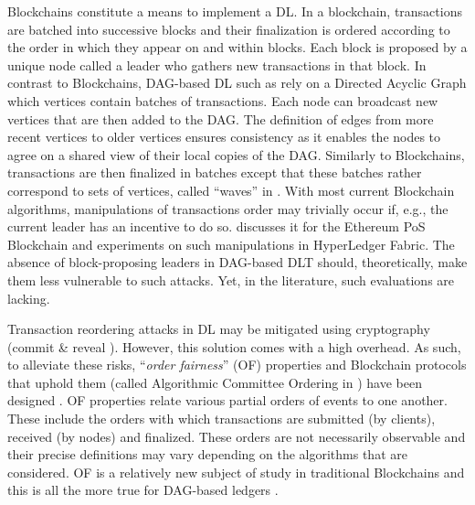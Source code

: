 Blockchains constitute a means to implement a DL.
In a blockchain, transactions are batched into successive blocks and their finalization is ordered according to the order in which they appear on and within blocks.
Each block is proposed by a unique node called a leader who gathers new transactions in that block.
In contrast to Blockchains, DAG-based DL \cite{sok_dag_based_blockchain_systems} such as \cite{all_you_need_is_dag,narwhal_and_tusk,bullshark,reducing_latency_of_dag_based_consensus_in_the_asynchronous_setting_via_the_utxo_model} rely on a Directed Acyclic Graph which vertices contain batches of transactions.
Each node can broadcast new vertices that are then added to the DAG. The definition of edges from more recent vertices to older vertices ensures consistency as it enables the nodes to agree on a shared view of their local copies of the DAG.
Similarly to Blockchains, transactions are then finalized in batches except that these batches rather correspond to sets of vertices, called ``waves'' in \cite{all_you_need_is_dag,bullshark,narwhal_and_tusk}.
With most current Blockchain algorithms, manipulations of transactions order may trivially occur if, e.g., the current leader has an incentive to do so.
\cite{exploiting_ethereum_after_the_merge_the_interplay_between_pos_and_mev_strategies} discusses it for the Ethereum PoS Blockchain and \cite{adversary_augmented_simulation_to_evaluate_client_fairness_on_hyperledger_fabric} experiments on such manipulations in HyperLedger Fabric.
The absence of block-proposing leaders in DAG-based DLT should, theoretically, make them less vulnerable to such attacks.
Yet, in the literature, such evaluations are lacking.



Transaction reordering attacks in DL may be mitigated using cryptography (commit \& reveal \cite{sok_preventing_transaction_reordering_manipulations_in_decentralized_finance,maximal_extractable_value_protection_on_a_DAG,fairness_notions_in_dag_based_dlts}). 
However, this solution comes with a high overhead.
As such, to alleviate these risks, ``\textit{order fairness}'' (OF) properties and Blockchain protocols that uphold them (called Algorithmic Committee Ordering in \cite{sok_preventing_transaction_reordering_manipulations_in_decentralized_finance}) have been designed \cite{order_fairness_for_byzantine_consensus,quick_order_fairness}.
OF properties relate various partial orders of events to one another.
These include the orders with which transactions are submitted (by clients), received (by nodes) and finalized.
These orders are not necessarily observable and their precise definitions may vary depending on the algorithms that are considered.
OF is a relatively new subject of study in traditional Blockchains and this is all the more true for DAG-based ledgers \cite{fairness_notions_in_dag_based_dlts}.


